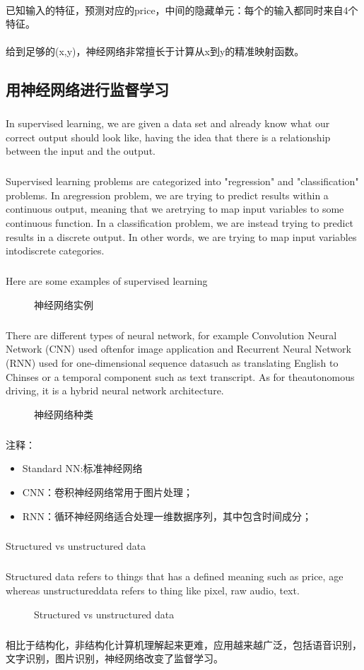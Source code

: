 \documentclass{article}
\begin{document}
\begin{CJK}{UTF8}{gbsn}
\paragraph{}
已知输入的特征，预测对应的price，中间的隐藏单元：每个的输入都同时来自4个特征。
\paragraph{}
给到足够的(x,y)，神经网络非常擅长于计算从x到y的精准映射函数。
\subsection{用神经网络进行监督学习}
\subparagraph{}
In supervised learning, we are given a data set and already know what our correct output should look like,
having the idea that there is a relationship between the input and the output.
\subparagraph{}
Supervised learning problems are categorized into "regression" and "classification" problems. In aregression problem, we are trying to predict results within a continuous output, meaning that we aretrying to map input variables to some continuous function. In a classification problem, we are instead
trying to predict results in a discrete output. In other words, we are trying to map input variables intodiscrete categories.
\subparagraph{}
Here are some examples of supervised learning
\begin{figure}[H]
\caption{神经网络实例}
\label{fig:1104}
\end{figure}
\subparagraph{}
There are different types of neural network, for example Convolution Neural Network (CNN) used oftenfor image application and Recurrent Neural Network (RNN) used for one-dimensional sequence datasuch as translating English to Chinses or a temporal component such as text transcript. As for theautonomous driving, it is a hybrid neural network architecture.
\begin{figure}[H]
\caption{神经网络种类}
\label{fig:1106}
\end{figure}
\subparagraph{}
注释：
\begin{itemize}
\item Standard NN:标准神经网络
\item CNN：卷积神经网络常用于图片处理；
\item RNN：循环神经网络适合处理一维数据序列，其中包含时间成分；
\end{itemize}
\subparagraph{}
Structured vs unstructured data
\subparagraph{}
Structured data refers to things that has a defined meaning such as price, age whereas unstructureddata refers to thing like pixel, raw audio, text.
\begin{figure}[H]
\caption{Structured vs unstructured data}
\label{fig:1105}
\end{figure}
\subparagraph{}
相比于结构化，非结构化计算机理解起来更难，应用越来越广泛，包括语音识别，文字识别，图片识别，神经网络改变了监督学习。

\end{CJK}
\end{document}
